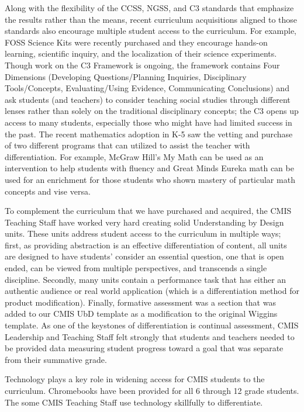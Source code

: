 \begin{findings}

Along with the flexibility of the CCSS, NGSS, and C3 standards that emphasize the results rather than the means, recent curriculum acquisitions aligned to those standards also encourage multiple student access to the curriculum. For example, FOSS Science Kits were recently purchased and they encourage hands-on learning, scientific inquiry, and the localization of their science experiments. Though work on the C3 Framework is ongoing, the framework contains Four Dimensions (Developing Questions/Planning Inquiries, Disciplinary Tools/Concepts, Evaluating/Using Evidence, Communicating Conclusions) and ask students (and teachers) to consider teaching social studies through different lenses rather than solely on the traditional disciplinary concepts; the C3 opens up access to many students, especially those who might have had limited success in the past. The recent mathematics adoption in K-5 saw the vetting and purchase of two different programs that can utilized to assist the teacher with differentiation. For example, McGraw Hill’s My Math can be used as an intervention to help students with fluency and Great Minds Eureka math can be used for an enrichment for those students who shown mastery of particular math concepts and vise versa. 


To complement the curriculum that we have purchased and acquired, the CMIS Teaching Staff have worked very hard creating solid Understanding by Design units. These units address student access to the curriculum in multiple ways; first, as providing abstraction is an effective differentiation of content, all units are designed to have students’ consider an essential question, one that is open ended, can be viewed from multiple perspectives, and transcends a single discipline. Secondly, many units contain a performance task that has either an authentic audience or real world application (which is a differentiation method for product modification). Finally, formative assessment was a section that was added to our CMIS UbD template as a modification to the original Wiggins template. As one of the keystones of differentiation is continual assessment, CMIS Leadership and Teaching Staff felt strongly that students and teachers needed to be provided data measuring student progress toward a goal that was separate from their summative grade. 

 
Technology plays a key role in widening access for CMIS students to the curriculum. Chromebooks have been provided  for all 6 through 12 grade students. The some CMIS Teaching Staff use technology skillfully to differentiate. 


\end{findings}

